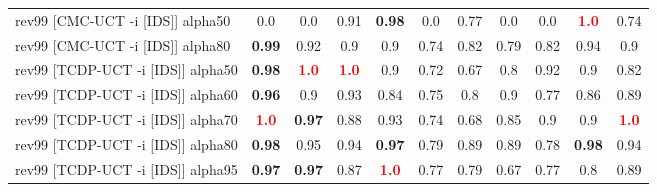 \documentclass{article}
\begin{document}
\begin{tabular}{|l|r@{$\pm$}rr@{$\pm$}rr@{$\pm$}rr@{$\pm$}rr@{$\pm$}rr@{$\pm$}rr@{$\pm$}rr@{$\pm$}rr@{$\pm$}rr@{$\pm$}r|}
\hline
rev99 [CMC-UCT -i [IDS]] alpha50
& \multicolumn{2}{c}{0.0}
& \multicolumn{2}{c}{0.0}
& \multicolumn{2}{c}{0.91}
& \multicolumn{2}{c}{\textbf{0.98}}
& \multicolumn{2}{c}{0.0}
& \multicolumn{2}{c}{0.77}
& \multicolumn{2}{c}{0.0}
& \multicolumn{2}{c}{0.0}
& \multicolumn{2}{c}{\textbf{\textcolor{red}{1.0}}}
& \multicolumn{2}{c|}{0.74}
\\
rev99 [CMC-UCT -i [IDS]] alpha80
& \multicolumn{2}{c}{\textbf{0.99}}
& \multicolumn{2}{c}{0.92}
& \multicolumn{2}{c}{0.9}
& \multicolumn{2}{c}{0.9}
& \multicolumn{2}{c}{0.74}
& \multicolumn{2}{c}{0.82}
& \multicolumn{2}{c}{0.79}
& \multicolumn{2}{c}{0.82}
& \multicolumn{2}{c}{0.94}
& \multicolumn{2}{c|}{0.9}
\\
rev99 [TCDP-UCT -i [IDS]] alpha50
& \multicolumn{2}{c}{\textbf{0.98}}
& \multicolumn{2}{c}{\textbf{\textcolor{red}{1.0}}}
& \multicolumn{2}{c}{\textbf{\textcolor{red}{1.0}}}
& \multicolumn{2}{c}{0.9}
& \multicolumn{2}{c}{0.72}
& \multicolumn{2}{c}{0.67}
& \multicolumn{2}{c}{0.8}
& \multicolumn{2}{c}{0.92}
& \multicolumn{2}{c}{0.9}
& \multicolumn{2}{c|}{0.82}
\\
rev99 [TCDP-UCT -i [IDS]] alpha60
& \multicolumn{2}{c}{\textbf{0.96}}
& \multicolumn{2}{c}{0.9}
& \multicolumn{2}{c}{0.93}
& \multicolumn{2}{c}{0.84}
& \multicolumn{2}{c}{0.75}
& \multicolumn{2}{c}{0.8}
& \multicolumn{2}{c}{0.9}
& \multicolumn{2}{c}{0.77}
& \multicolumn{2}{c}{0.86}
& \multicolumn{2}{c|}{0.89}
\\
rev99 [TCDP-UCT -i [IDS]] alpha70
& \multicolumn{2}{c}{\textbf{\textcolor{red}{1.0}}}
& \multicolumn{2}{c}{\textbf{0.97}}
& \multicolumn{2}{c}{0.88}
& \multicolumn{2}{c}{0.93}
& \multicolumn{2}{c}{0.74}
& \multicolumn{2}{c}{0.68}
& \multicolumn{2}{c}{0.85}
& \multicolumn{2}{c}{0.9}
& \multicolumn{2}{c}{0.9}
& \multicolumn{2}{c|}{\textbf{\textcolor{red}{1.0}}}
\\
rev99 [TCDP-UCT -i [IDS]] alpha80
& \multicolumn{2}{c}{\textbf{0.98}}
& \multicolumn{2}{c}{0.95}
& \multicolumn{2}{c}{0.94}
& \multicolumn{2}{c}{\textbf{0.97}}
& \multicolumn{2}{c}{0.79}
& \multicolumn{2}{c}{0.89}
& \multicolumn{2}{c}{0.89}
& \multicolumn{2}{c}{0.78}
& \multicolumn{2}{c}{\textbf{0.98}}
& \multicolumn{2}{c|}{0.94}
\\
rev99 [TCDP-UCT -i [IDS]] alpha95
& \multicolumn{2}{c}{\textbf{0.97}}
& \multicolumn{2}{c}{\textbf{0.97}}
& \multicolumn{2}{c}{0.87}
& \multicolumn{2}{c}{\textbf{\textcolor{red}{1.0}}}
& \multicolumn{2}{c}{0.77}
& \multicolumn{2}{c}{0.79}
& \multicolumn{2}{c}{0.67}
& \multicolumn{2}{c}{0.77}
& \multicolumn{2}{c}{0.8}
& \multicolumn{2}{c|}{0.89}
\\
\hline
\end{tabular}%
\end{document}
